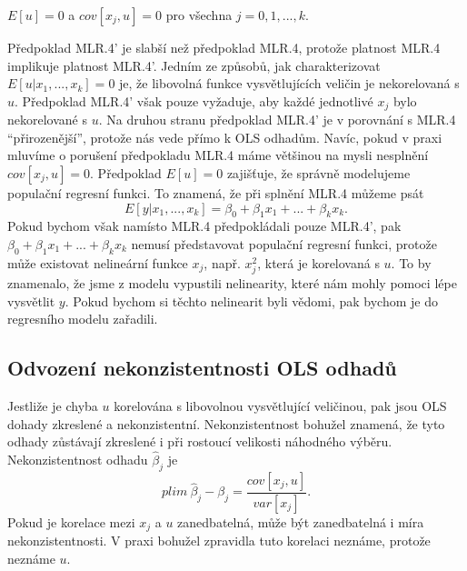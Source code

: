 \begin{assumption}
$E[u] = 0$ a $cov[x_j, u] = 0$ pro všechna $j = 0, 1, ..., k$.

\raggedleft{$\clubsuit$}
\end{assumption}

Předpoklad MLR.4' je slabší než předpoklad MLR.4, protože platnost MLR.4 implikuje platnost MLR.4'. Jedním ze způsobů, jak charakterizovat 
$E[u|x_1, ..., x_k] = 0$ je, že libovolná funkce vysvětlujících veličin je nekorelovaná s $u$. Předpoklad MLR.4' však pouze vyžaduje, aby 
každé jednotlivé $x_j$ bylo nekorelované s $u$. Na druhou stranu předpoklad MLR.4' je v porovnání s MLR.4 ``přirozenější'', 
protože nás vede přímo k OLS odhadům. Navíc, pokud v praxi mluvíme o porušení předpokladu MLR.4 máme většinou na mysli nesplnění $cov[x_j, 
u] = 0$. Předpoklad $E[u] = 0$ zajišťuje, že správně modelujeme populační regresní funkci. To znamená, že při splnění MLR.4 můžeme psát
\begin{equation}
E[y|x_1, ..., x_k] = \beta_0 + \beta_1 x_1 + ... + \beta_k x_k.
\end{equation}
Pokud bychom však namísto MLR.4 předpokládali pouze MLR.4', pak $\beta_0 + \beta_1 x_1 + ... + \beta_k x_k$ nemusí představovat populační 
regresní funkci, protože může existovat nelineární funkce $x_j$, např. $x_j^2$, která je korelovaná s $u$. To by znamenalo, že jsme z modelu 
vypustili nelinearity, které nám mohly pomoci lépe vysvětlit $y$. Pokud bychom si těchto nelinearit byli vědomi, pak bychom je do regresního 
modelu zařadili.

\subsection{Odvození nekonzistentnosti OLS odhadů}

Jestliže je chyba $u$ korelována s libovolnou vysvětlující veličinou, pak jsou OLS dohady zkreslené a nekonzistentní. Nekonzistentnost 
bohužel znamená, že tyto odhady zůstávají zkreslené i při rostoucí velikosti náhodného výběru. Nekonzistentnost odhadu $\hat{\beta}_j$ je
\begin{equation}
plim ~ \hat{\beta}_j - \beta_j = \frac{cov[x_j, u]}{var[x_j]}.
\end{equation}
Pokud je korelace mezi $x_j$ a $u$ zanedbatelná, může být zanedbatelná i míra nekonzistentnosti. V praxi bohužel zpravidla tuto korelaci 
neznáme, protože neznáme $u$.

